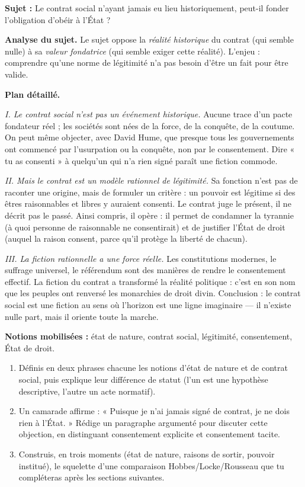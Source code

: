 \documentclass[11pt]{article}
\begin{document}
\begin{exoresolu}
\textbf{Sujet :} Le contrat social n'ayant jamais eu lieu historiquement, peut-il fonder l'obligation d'obéir à l'État ?

\tcblower

\textbf{Analyse du sujet.} Le sujet oppose la \emph{réalité historique} du contrat (qui semble nulle) à sa \emph{valeur fondatrice} (qui semble exiger cette réalité). L'enjeu : comprendre qu'une norme de légitimité n'a pas besoin d'être un fait pour être valide.

\textbf{Plan détaillé.}

\emph{I. Le contrat social n'est pas un événement historique.} Aucune trace d'un pacte fondateur réel ; les sociétés sont nées de la force, de la conquête, de la coutume. On peut même objecter, avec David Hume, que presque tous les gouvernements ont commencé par l'usurpation ou la conquête, non par le consentement. Dire « tu as consenti » à quelqu'un qui n'a rien signé paraît une fiction commode.

\emph{II. Mais le contrat est un modèle rationnel de légitimité.} Sa fonction n'est pas de raconter une origine, mais de formuler un critère : un pouvoir est légitime si des êtres raisonnables et libres y auraient consenti. Le contrat juge le présent, il ne décrit pas le passé. Ainsi compris, il opère : il permet de condamner la tyrannie (à quoi personne de raisonnable ne consentirait) et de justifier l'État de droit (auquel la raison consent, parce qu'il protège la liberté de chacun).

\emph{III. La fiction rationnelle a une force réelle.} Les constitutions modernes, le suffrage universel, le référendum sont des manières de rendre le consentement effectif. La fiction du contrat a transformé la réalité politique : c'est en son nom que les peuples ont renversé les monarchies de droit divin. Conclusion : le contrat social est une fiction au sens où l'horizon est une ligne imaginaire — il n'existe nulle part, mais il oriente toute la marche.

\textbf{Notions mobilisées :} état de nature, contrat social, légitimité, consentement, État de droit.
\end{exoresolu}

\begin{exercice}
\begin{enumerate}
\item Définis en deux phrases chacune les notions d'état de nature et de contrat social, puis explique leur différence de statut (l'un est une hypothèse descriptive, l'autre un acte normatif).
\item Un camarade affirme : « Puisque je n'ai jamais signé de contrat, je ne dois rien à l'État. » Rédige un paragraphe argumenté pour discuter cette objection, en distinguant consentement explicite et consentement tacite.
\item Construis, en trois moments (état de nature, raisons de sortir, pouvoir institué), le squelette d'une comparaison Hobbes/Locke/Rousseau que tu compléteras après les sections suivantes.
\end{enumerate}
\end{exercice}
\end{document}
